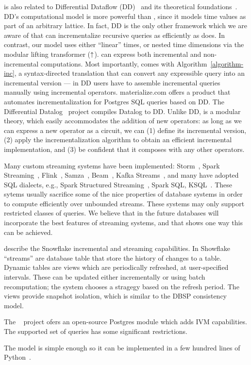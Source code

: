 \dbsp is also related to Differential Dataflow
(DD)~\cite{mcsherry-cidr13,murray-sosp13,chothia-vldb16} and its
theoretical foundations~\cite{abadi-fossacs15}.  DD's computational
model is more powerful than \dbsp, since it models time values as part
of an arbitrary lattice.  In fact, DD is the only other framework
which we are aware of that can incrementalize recursive queries as
efficiently as \dbsp does.  In contrast, our model uses either
``linear'' times, or nested time dimensions via the modular lifting
transformer (${\uparrow}$).  \dbsp can express both incremental and
non-incremental computations.  Most importantly, \dbsp comes with
Algorithm~\ref{algorithm-inc}, a syntax-directed translation that can
convert any expressible query into an incremental version --- in DD
users have to assemble incremental queries manually using incremental
operators.  materialize.com offers a product that automates
incrementalization for Postgres SQL queries based on DD.  The
Differential Datalog~\cite{ryzhyk-datalog19} project compiles Datalog
to DD.  Unlike DD, \dbsp is a modular theory, which easily
accommodates the addition of new operators: as long as we can express
a new operator as a \dbsp circuit, we can (1) define its incremental
version, (2) apply the incrementalization algorithm to obtain an
efficient incremental implementation, and (3) be confident that it
composes with any other operators.

Many custom streaming systems have been implemented:
Storm~\cite{toshnival-sigmod14}, Spark
Streaming~\cite{zaharia-sosp13}, Flink~\cite{carbone-ieee15},
Samza~\cite{noghabi-vldb17}, Beam~\cite{akidau-vldb15}, Kafka
Streams~\cite{wang-sigmod21}, and many have adopted SQL dialects,
e.g., Spark Structured Streaming~\cite{armbrust-sigmod18}, Spark SQL,
KSQL~\cite{jafarpour-edbt19}.  These sytems usually sacrifice some of
the nice properties of database systems in order to compute
efficiently over unbounded streams.  These systems may only support
restricted classes of queries.  We believe that in the future
databases will incorporate the best features of streaming systems, and
that \dbsp shows one way this can be achieved.

\cite{akidau-amd23,akidau-debs24} describe the Snowflake incremental
and streaming capabilities.  In Showflake ``streams'' are database
table that store the history of changes to a table.  Dynamic tables
are views which are periodically refreshed, at user-specified
intervals.  These can be updated either incrementally or using batch
recomputation; the system chooses a stragegy based on the refresh
period.  The views provide snapshot isolation, which is similar to the
DBSP consistency model.

The ~\cite{pgivm} project ofers an open-source Postgres
module which adds IVM capabilities.  The supported set of queries has
some significant restrictions.

The \dbsp model is simple enough so it can be implemented in a few
hundred lines of Python~\cite{dbsp-python}.
